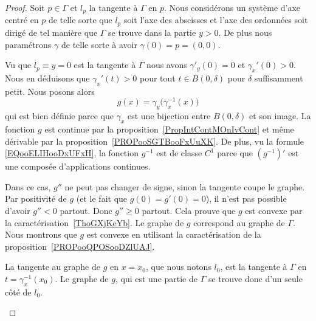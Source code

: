 \begin{proof}
	Soit \( p\in \Gamma\) et \( l_p\) la tangente à \( \Gamma\) en \( p\). Nous considérons un système d'axe centré en \( p\) de telle sorte que \( l_p\) soit l'axe des abscisses et l'axe des ordonnées soit dirigé de tel manière que \( \Gamma\) se trouve dans la partie \( y>0\). De plus nous paramétrons \( \gamma\) de telle sorte à avoir \( \gamma(0)=p=(0,0)\).

	Vu que \( l_p\equiv y=0\) est la tangente à \( \Gamma\) nous avons \( \gamma'_y(0)=0\) et \( \gamma_x'(0)>0\). Nous en déduisons que \( \gamma_x'(t)>0\) pour tout \( t\in B(0,\delta)\) pour \( \delta\) suffisamment petit. Nous posons alors
	\begin{equation}
		g(x)=\gamma_y\big( \gamma_x^{-1}(x) \big)
	\end{equation}
	qui est bien définie parce que \( \gamma_x\) est une bijection entre \( B(0,\delta)\) et son image. La fonction \( g\) est continue par la proposition~\ref{PropIntContMOnIvCont} et même dérivable par la proposition~\ref{PROPooSGTBooFxUuXK}. De plus, vu la formule \eqref{EQooELIHooDxUFxH}, la fonction \( g^{-1}\) est de classe \( C^1\) parce que \( (g^{-1})'\) est une composée d'applications continues.

	\begin{subproof}
		\spitem[Si \( g\) est \( C^2\)]
		Dans ce cas, \( g''\) ne peut pas changer de signe, sinon la tangente coupe le graphe. Par positivité de \( g\) (et le fait que \( g(0)=g'(0)=0\)), il n'est pas possible d'avoir \( g''<0\) partout. Donc \( g''\geq 0\) partout. Cela prouve que \( g\) est convexe par la caractérisation~\ref{ThoGXjKeYb}.
		Le graphe de \( g\) correspond au graphe de \( \Gamma\). Nous montrons que \( g\) est convexe en utilisant la caractérisation de la proposition~\ref{PROPooQPOSooDZlUAJ}.

		La tangente au graphe de \( g\) en \( x=x_0\), que nous notons \( l_0\), est la tangente à \( \Gamma\) en \( t=\gamma_x^{-1}(x_0)\). Le graphe de \( g\), qui est une partie de \( \Gamma\) se trouve donc d'un seule côté de \(l_0\).


\end{subproof}
\end{proof}
